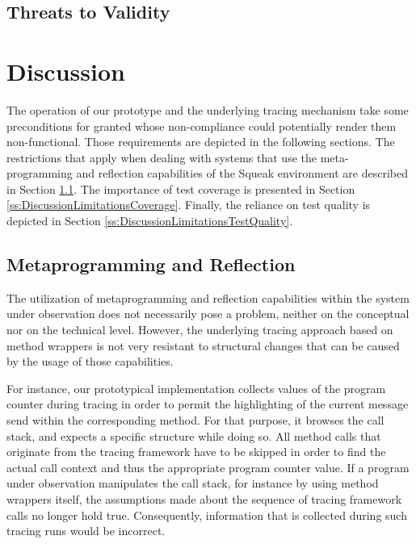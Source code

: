 \subsection{Threats to Validity}
\label{ss:DiscussionEvaluationThreats}

\clearpage
\section{Discussion}
\label{s:DiscussionLimitations}
The operation of our prototype and the underlying tracing mechanism take some preconditions for granted whose non-compliance could potentially render them non-functional.
Those requirements are depicted in the following sections.
The restrictions that apply when dealing with systems that use the meta-programming and reflection capabilities of the Squeak environment are described in Section \ref{ss:DiscussionLimitationsMeta}.
The importance of test coverage is presented in Section \ref{ss:DiscussionLimitationsCoverage}.
Finally, the reliance on test quality is depicted in Section \ref{ss:DiscussionLimitationsTestQuality}.

\subsection{Metaprogramming and Reflection}
\label{ss:DiscussionLimitationsMeta}
The utilization of metaprogramming and reflection capabilities within the system under observation does not necessarily pose a problem, neither on the conceptual nor on the technical level.
However, the underlying tracing approach based on method wrappers is not very resistant to structural changes that can be caused by the usage of those capabilities.

For instance, our prototypical implementation collects values of the program counter during tracing in order to permit the highlighting of the current message send within the corresponding method.
For that purpose, it browses the call stack, and expects a specific structure while doing so.
All method calls that originate from the tracing framework have to be skipped in order to find the actual call context and thus the appropriate program counter value.
If a program under observation manipulates the call stack, for instance by using method wrappers itself, the assumptions made about the sequence of tracing framework calls no longer hold true.
Consequently, information that is collected during such tracing runs would be incorrect.

